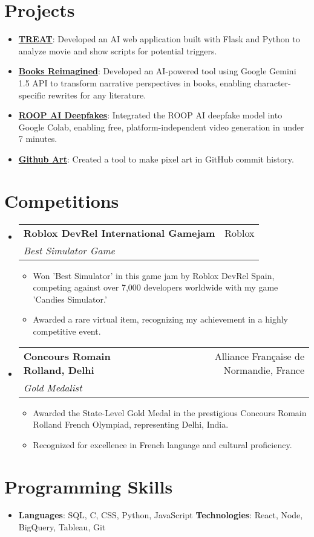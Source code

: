 \documentclass[letterpaper,11pt]{article}
\makeatletter
\newcommand{\resumeItem}[2]{
  \item\small{
    \textbf{#1}{: #2 \vspace{-2pt}}
  }
}
\newcommand{\resumeSubheading}[4]{
  \vspace{-1pt}\item
    \begin{tabular*}{0.97\textwidth}{l@{\extracolsep{\fill}}r}
      \textbf{#1} & #2 \\
      \textit{\small#3} & \textit{\small #4} \\
    \end{tabular*}\vspace{-5pt}
}
\newcommand{\resumeSubHeadingListStart}{\begin{itemize}[leftmargin=*]}
\newcommand{\resumeSubHeadingListEnd}{\end{itemize}}
\newcommand{\resumeItemListStart}{\begin{itemize}}
\newcommand{\resumeItemListEnd}{\end{itemize}\vspace{-5pt}}
\makeatother
\begin{document}
\section*{Projects}
\resumeSubHeadingListStart
  \resumeItem{\href{https://github.com/Kuberwastaken/TREAT-CS50}{TREAT}}{Developed an AI web application built with Flask and Python to analyze movie and show scripts for potential triggers.}
  \resumeItem{\href{https://www.kaggle.com/code/kubermehta/books-reimagined-diary-of-a-wimpy-kid-by-rodrick}{Books Reimagined}}{Developed an AI-powered tool using Google Gemini 1.5 API to transform narrative perspectives in books, enabling character-specific rewrites for any literature.}
  \resumeItem{\href{https://github.com/Kuberwastaken/ROOP-AI-Deepfakes}{ROOP AI Deepfakes}}{Integrated the ROOP AI deepfake model into Google Colab, enabling free, platform-independent video generation in under 7 minutes.}
  \resumeItem{\href{https://github.com/Kuberwastaken/Github-Art}{Github Art}}{Created a tool to make pixel art in GitHub commit history.}
\resumeSubHeadingListEnd

\section*{Competitions}
\resumeSubHeadingListStart
  \resumeSubheading
    {Roblox DevRel International Gamejam}{Roblox}
    {Best Simulator Game}{}
    \resumeItemListStart
      \item Won 'Best Simulator' in this game jam by Roblox DevRel Spain, competing against over 7,000 developers worldwide with my game 'Candies Simulator.' 
      \item Awarded a rare virtual item, recognizing my achievement in a highly competitive event.
    \resumeItemListEnd
  
  \resumeSubheading
    {Concours Romain Rolland, Delhi}{Alliance Française de Normandie, France}
    {Gold Medalist}{}
    \resumeItemListStart
      \item Awarded the State-Level Gold Medal in the prestigious Concours Romain Rolland French Olympiad, representing Delhi, India.
      \item Recognized for excellence in French language and cultural proficiency.
    \resumeItemListEnd
\resumeSubHeadingListEnd

\section*{Programming Skills}
\resumeSubHeadingListStart
  \item{
    \textbf{Languages}{: SQL, C, CSS, Python, JavaScript}
    \hfill
    \textbf{Technologies}{: React, Node, BigQuery, Tableau, Git}
  }
\resumeSubHeadingListEnd
\end{document}
